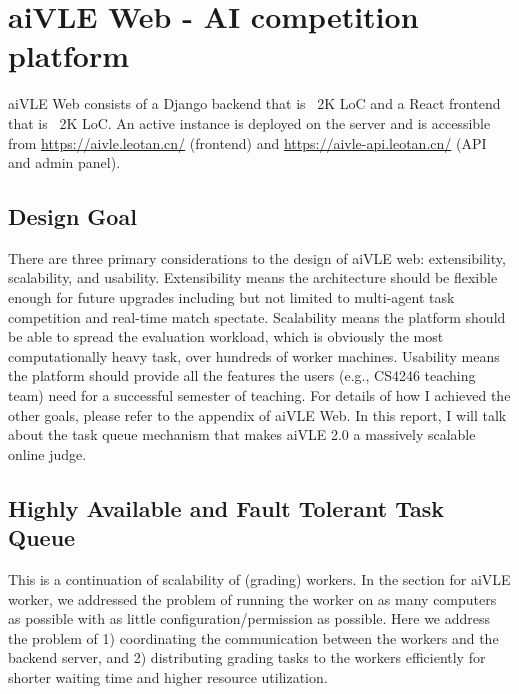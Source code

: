 \documentclass[fyp]{socreport}
\begin{document}
\section{aiVLE Web - AI competition platform}
\label{ch:aivle-web}
aiVLE Web consists of a Django backend that is ~2K LoC and a React frontend that is ~2K LoC. An active instance is deployed on the server and is accessible from \href{https://aivle.leotan.cn/}{https://aivle.leotan.cn/} (frontend) and \href{https://aivle-api.leotan.cn/}{https://aivle-api.leotan.cn/} (API and admin panel).

\subsection{Design Goal}
There are three primary considerations to the design of aiVLE web: extensibility, scalability, and usability. 
Extensibility means the architecture should be flexible enough for future upgrades including but not limited to multi-agent task competition and real-time match spectate. Scalability means the platform should be able to spread the evaluation workload, which is obviously the most computationally heavy task, over hundreds of worker machines. Usability means the platform should provide all the features the users (e.g., CS4246 teaching team) need for a successful semester of teaching.
For details of how I achieved the other goals, please refer to the appendix of aiVLE Web. In this report, I will talk about the task queue mechanism that makes aiVLE 2.0 a massively scalable online judge.

\subsection{Highly Available and Fault Tolerant Task Queue}
\label{ch:aivle-web_highly-available-task-queue}
This is a continuation of scalability of (grading) workers. In the section for aiVLE worker, we addressed the problem of running the worker on as many computers as possible with as little configuration/permission as possible. Here we address the problem of 1) coordinating the communication between the workers and the backend server, and 2) distributing grading tasks to the workers efficiently for shorter waiting time and higher resource utilization.
\end{document}
